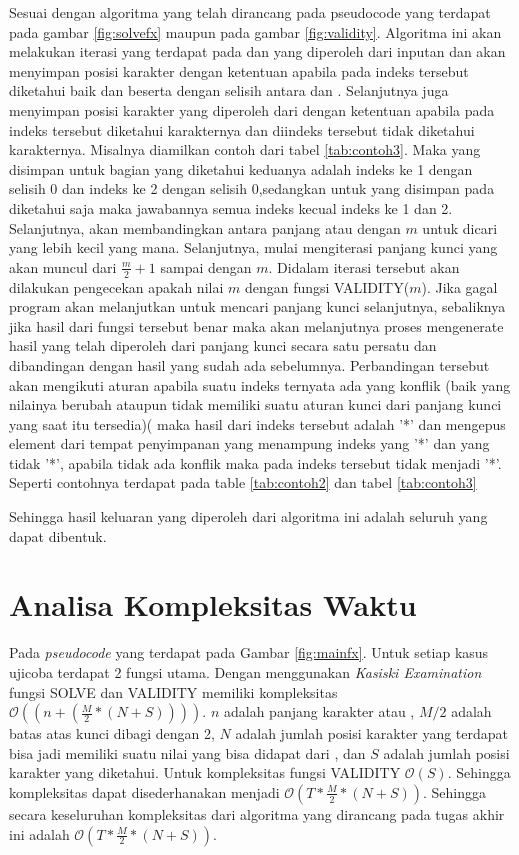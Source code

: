 \indent Sesuai dengan algoritma yang telah dirancang pada pseudocode yang terdapat pada gambar \ref{fig:solvefx} maupun pada gambar \ref{fig:validity}. Algoritma ini akan melakukan iterasi yang terdapat pada \plaintext dan \ciphertext yang diperoleh dari inputan dan akan menyimpan posisi karakter dengan ketentuan apabila pada indeks 
tersebut diketahui baik \plaintext dan \ciphertext beserta dengan selisih antara \ciphertext dan \plaintext. Selanjutnya juga menyimpan posisi karakter yang diperoleh dari \ciphertext dengan ketentuan apabila \ciphertext pada indeks tersebut diketahui karakternya dan \plaintext diindeks tersebut tidak diketahui karakternya. Misalnya diamilkan contoh dari tabel \ref{tab:contoh3}. Maka yang disimpan untuk bagian yang diketahui keduanya adalah indeks ke 1 dengan selisih 0 dan indeks ke 2 dengan selisih 0,sedangkan untuk yang disimpan pada diketahui \ciphertext saja maka jawabannya semua indeks kecual indeks ke 1 dan 2. Selanjutnya, akan membandingkan antara panjang \plaintext atau \ciphertext dengan $m$ untuk dicari yang lebih kecil yang mana. Selanjutnya, mulai mengiterasi panjang kunci yang akan muncul dari $\frac{m}{2}+1$ sampai dengan $m$. Didalam iterasi tersebut akan dilakukan pengecekan apakah nilai $m$ dengan fungsi VALIDITY($m$). Jika gagal program akan melanjutkan untuk mencari panjang kunci selanjutnya, sebaliknya jika hasil dari fungsi tersebut benar maka akan melanjutnya proses mengenerate hasil yang telah diperoleh dari panjang kunci secara satu persatu dan dibandingan dengan hasil yang sudah ada sebelumnya. Perbandingan tersebut akan mengikuti aturan apabila suatu indeks ternyata ada yang konflik (baik yang nilainya berubah ataupun tidak memiliki suatu aturan kunci dari panjang kunci yang saat itu tersedia)( maka hasil dari indeks tersebut adalah '*' dan mengepus element dari tempat penyimpanan yang menampung indeks \plaintext yang '*' dan \ciphertext yang tidak '*', apabila tidak ada konflik maka \plaintext pada indeks tersebut tidak menjadi '*'. Seperti contohnya terdapat pada table \ref{tab:contoh2} dan tabel \ref{tab:contoh3}  


\indent Sehingga hasil keluaran yang diperoleh dari algoritma ini adalah seluruh \plaintext yang dapat dibentuk.

\section{Analisa Kompleksitas Waktu}
Pada \textit{pseudocode} yang terdapat pada Gambar \ref{fig:mainfx}. Untuk setiap kasus ujicoba terdapat 2 fungsi utama. Dengan menggunakan \textit{Kasiski Examination} fungsi SOLVE dan VALIDITY memiliki kompleksitas $\mathcal{O}((n+(\frac{M}{2}*(N+S))))$. $n$ adalah panjang karakter \plaintext atau \ciphertext , $M/2$ adalah batas atas kunci dibagi dengan 2, $N$ adalah jumlah posisi karakter yang terdapat bisa jadi memiliki suatu nilai yang bisa didapat dari \ciphertext, dan $S$ adalah jumlah posisi karakter yang diketahui. Untuk kompleksitas fungsi VALIDITY $\mathcal{O}(S)$. Sehingga kompleksitas dapat disederhanakan menjadi $\mathcal{O}(T*\frac{M}{2}*(N+S))$.
\indent Sehingga secara keseluruhan kompleksitas dari algoritma yang dirancang pada tugas akhir ini adalah $\mathcal{O}(T*\frac{M}{2}*(N+S))$.

